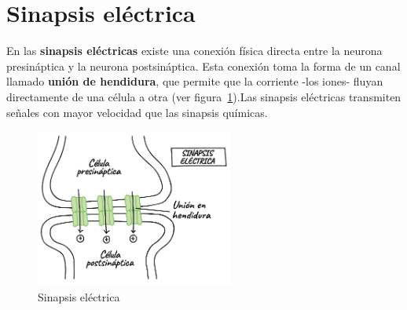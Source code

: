 \section{Sinapsis eléctrica}
En las \textbf{sinapsis eléctricas} existe una conexión física directa entre la neurona presináptica y la neurona postsináptica. Esta conexión toma la forma de un canal llamado \textbf{unión de hendidura}, que permite que la corriente -los iones- fluyan directamente de una célula a otra (ver figura~\ref{fig:sinapsis_electrica}).Las sinapsis eléctricas transmiten señales con mayor velocidad que las sinapsis químicas.
\begin{figure}[htbp!]
    \centering
    \includegraphics[width=6.5cm]{figures/Sinapsis_electrica.png}
    \caption{Sinapsis eléctrica}
    \label{fig:sinapsis_electrica}
\end{figure}
